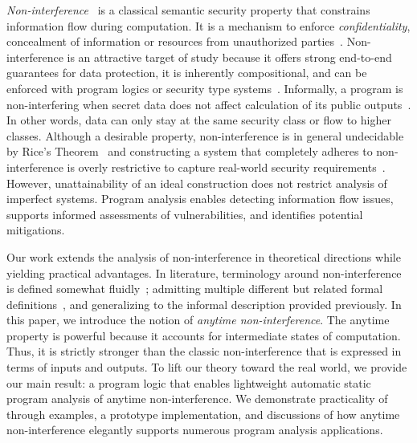 \emph{Non-interference}~\cite{goguen1982} is a classical semantic security
property that constrains information flow during computation. It is a mechanism
to enforce \emph{confidentiality}, \ie concealment of information or resources
from unauthorized parties~\cite{bishop2003}. Non-interference is an attractive
target of study because it offers strong end-to-end guarantees for data
protection, it is inherently compositional, and can be enforced with program
logics or security type systems~\cite{cecchetti2017,frumin2021}. Informally, a
program is non-interfering when secret data does not affect calculation of its
public outputs~\cite{sabelfeld2003}. In other words, data can only stay at the
same security class or flow to higher classes. Although a desirable property,
non-interference is in general undecidable by Rice's Theorem~\cite{rice1953} and
constructing a system that completely adheres to non-interference is overly
restrictive to capture real-world security
requirements~\cite{bossi2005,cecchetti2017}. However, unattainability of an
ideal construction does not restrict analysis of imperfect systems. Program
analysis enables detecting information flow issues, supports informed
assessments of vulnerabilities, and identifies potential mitigations.

Our work extends the analysis of non-interference in theoretical directions
while yielding practical advantages. In literature, terminology around
non-interference is defined somewhat fluidly~\cite{sabelfeld2003}; admitting
multiple different but related {formal definitions}~\cite{nelson2020}, and
generalizing to the informal description provided previously. In this paper, we
introduce the notion of \emph{anytime non-interference}.
The anytime property is
powerful because it accounts for intermediate states of computation. Thus, it is
strictly stronger than the classic non-interference that is expressed in terms
of inputs and outputs. To lift our theory toward the real world, we provide our
main result: a program logic \lname that enables lightweight automatic static
program analysis of anytime non-interference.
We demonstrate practicality of
\lname through examples, a prototype implementation, and discussions of how
anytime non-interference elegantly supports numerous program analysis
applications.

